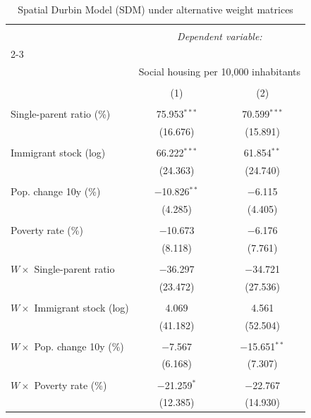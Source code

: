 
\begin{table}[!htbp] \centering 
  \caption{Spatial Durbin Model (SDM) under alternative weight matrices} 
  \label{tab:sdm} 
\begin{tabular}{@{\extracolsep{5pt}}lcc} 
\\[-1.8ex]\hline 
\hline \\[-1.8ex] 
 & \multicolumn{2}{c}{\textit{Dependent variable:}} \\ 
\cline{2-3} 
\\[-1.8ex] & \multicolumn{2}{c}{Social housing per 10,000 inhabitants} \\ 
\\[-1.8ex] & (1) & (2)\\ 
\hline \\[-1.8ex] 
 Single-parent ratio (\%) & 75.953$^{***}$ & 70.599$^{***}$ \\ 
  & (16.676) & (15.891) \\ 
  & & \\ 
 Immigrant stock (log) & 66.222$^{***}$ & 61.854$^{**}$ \\ 
  & (24.363) & (24.740) \\ 
  & & \\ 
 Pop. change 10y (\%) & $-$10.826$^{**}$ & $-$6.115 \\ 
  & (4.285) & (4.405) \\ 
  & & \\ 
 Poverty rate (\%) & $-$10.673 & $-$6.176 \\ 
  & (8.118) & (7.761) \\ 
  & & \\ 
 $W \times$ Single-parent ratio & $-$36.297 & $-$34.721 \\ 
  & (23.472) & (27.536) \\ 
  & & \\ 
 $W \times$ Immigrant stock (log) & 4.069 & 4.561 \\ 
  & (41.182) & (52.504) \\ 
  & & \\ 
 $W \times$ Pop. change 10y (\%) & $-$7.567 & $-$15.651$^{**}$ \\ 
  & (6.168) & (7.307) \\ 
  & & \\ 
 $W \times$ Poverty rate (\%) & $-$21.259$^{*}$ & $-$22.767 \\ 
  & (12.385) & (14.930) \\ 

\end{tabular}
\end{table}
